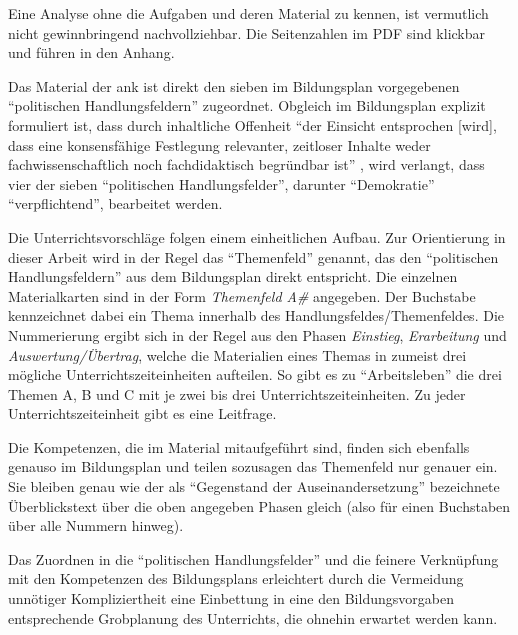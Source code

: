 \noindent Eine Analyse ohne die Aufgaben und deren Material zu kennen, ist vermutlich nicht gewinnbringend nachvollziehbar. Die Seitenzahlen im PDF sind klickbar und führen in den Anhang. 
\bigskip


Das Material der \gls{ank} ist direkt den sieben im Bildungsplan vorgegebenen \enquote{politischen Handlungsfeldern} \autocite[3, 15]{bplan} zugeordnet.
Obgleich im Bildungsplan explizit formuliert ist, dass durch inhaltliche Offenheit \enquote{der Einsicht entsprochen [wird], dass eine konsensfähige Festlegung relevanter, zeitloser Inhalte weder fachwissenschaftlich noch fachdidaktisch begründbar ist} \autocite[15]{bplan}, wird verlangt, dass vier der sieben \enquote{politischen Handlungsfelder}, darunter \enquote{Demokratie} \enquote{verpflichtend}, bearbeitet werden.

Die Unterrichtsvorschläge folgen einem einheitlichen Aufbau. Zur Orientierung in dieser Arbeit wird in der Regel das \enquote{Themenfeld} genannt, das den \enquote{politischen Handlungsfeldern} aus dem Bildungsplan direkt entspricht. 
Die einzelnen Materialkarten sind in der Form \emph{Themenfeld A\#} angegeben. 
Der Buchstabe kennzeichnet dabei ein Thema innerhalb des Handlungsfeldes/Themenfeldes.
Die Nummerierung ergibt sich in der Regel aus den Phasen \emph{Einstieg}, \emph{Erarbeitung} und \emph{Auswertung/Übertrag}, welche die Materialien eines Themas in zumeist drei mögliche Unterrichtszeiteinheiten aufteilen. So gibt es zu \enquote{Arbeitsleben} die drei Themen A, B und C mit je zwei bis drei Unterrichtszeiteinheiten.
Zu jeder Unterrichtszeiteinheit gibt es eine Leitfrage. %

Die Kompetenzen, die im Material mitaufgeführt sind, finden sich ebenfalls genauso im Bildungsplan und teilen sozusagen das Themenfeld nur genauer ein. Sie bleiben genau wie der als \enquote{Gegenstand der Auseinandersetzung} bezeichnete Überblickstext über die oben angegeben Phasen gleich (also für einen Buchstaben über alle Nummern hinweg). 

Das Zuordnen in die \enquote{politischen Handlungsfelder} und die feinere Verknüpfung mit den Kompetenzen des Bildungsplans erleichtert durch die Vermeidung unnötiger Kompliziertheit eine Einbettung in eine den Bildungsvorgaben entsprechende Grobplanung des Unterrichts, die ohnehin erwartet werden kann.

